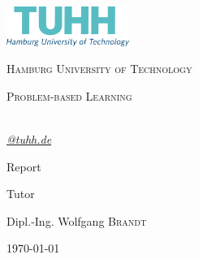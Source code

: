 \begin{titlepage}
	\centering
	\includegraphics[width=0.30\textwidth]{pictures/office_rgb_en.png}\par\vspace{1cm}
	{\scshape\LARGE Hamburg University of Technology \par}
	\vspace{1cm}
	{\scshape\Large Problem-based Learning\par}
	\vspace{1.5cm}
	{\huge\bfseries \thetitle\par}
	\vspace{2cm}
	{\Large\itshape \theauthor\\\href{mailto:@tuhh.de}{@tuhh.de}\par}
		 
	 
	\vfill	%
	Report\par	%
	
	\vfill	%
	Tutor\par
	Dipl.-Ing. Wolfgang \textsc{Brandt}

	\vfill

	{\large \today\par}
\end{titlepage}


